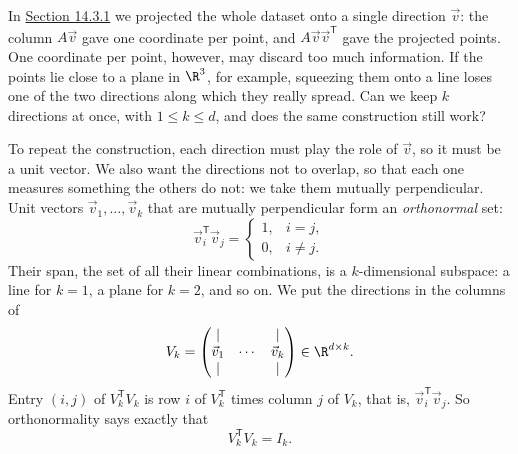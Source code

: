 \documentclass[a4paper,12pt,oneside]{report}
\begin{document}
In \hyperref[sec:project-data-matrix]{Section 14.3.1} we projected
the whole dataset onto a single direction $\vec v$: the column
$A\vec v$ gave one coordinate per point, and $A\vec v\vec v^{\mathsf T}$
gave the projected points. One coordinate per point, however, may
discard too much information. If the points lie close to a plane in
$\R^3$, for example, squeezing them onto a line loses one of the two
directions along which they really spread. Can we keep $k$ directions
at once, with $1\leq k\leq d$, and does the same construction still
work?

To repeat the construction, each direction must play the role of
$\vec v$, so it must be a unit vector. We also want the directions
not to overlap, so that each one measures something the others do
not: we take them mutually perpendicular.
\label{def:orthonormal}Unit vectors
$\vec v_1,\ldots,\vec v_k$ that are mutually perpendicular form an
\emph{orthonormal} set:
\[
  \vec v_i^{\mathsf T}\vec v_j=
  \begin{cases}1,&i=j,\\0,&i\neq j.\end{cases}
\]
Their span, the set of all their linear combinations, is a
$k$-dimensional subspace: a line for $k=1$, a plane for $k=2$, and so
on. We put the directions in the columns of
\[
  V_k=\begin{pmatrix}\vert&&\vert\\
    \vec v_1&\cdots&\vec v_k\\\vert&&\vert\end{pmatrix}
    \in\R^{d\times k}.
\]
Entry $(i,j)$ of $V_k^{\mathsf T}V_k$ is row $i$ of $V_k^{\mathsf T}$
times column $j$ of $V_k$, that is, $\vec v_i^{\mathsf T}\vec v_j$.
So orthonormality says exactly that
\[
  V_k^{\mathsf T}V_k=I_k .
\]
\end{document}
